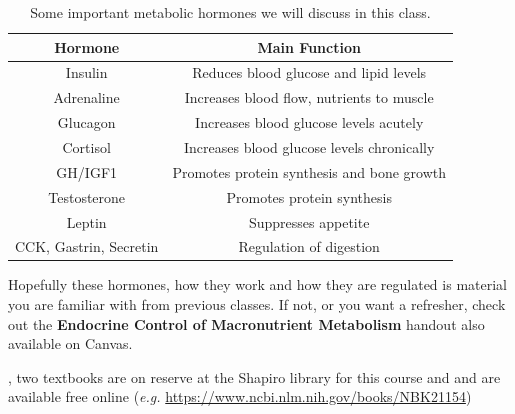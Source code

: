\documentclass{tufte-handout}
\begin{document}
\begin{table}[h]
\centering
\caption{Some important metabolic hormones we will discuss in this class.}
\label{tab:hormones}
\begin{tabular}{cc}
\hline
\textbf{Hormone}       & \textbf{Main Function}                     \\
\hline
Insulin                & Reduces blood glucose and lipid levels     \\
Adrenaline			   & Increases blood flow, nutrients to muscle \\
Glucagon               & Increases blood glucose levels acutely     \\
Cortisol               & Increases blood glucose levels chronically \\
GH/IGF1                & Promotes protein synthesis and bone growth \\
Testosterone           & Promotes protein synthesis                 \\
Leptin                 & Suppresses appetite                        \\
CCK, Gastrin, Secretin & Regulation of digestion                   \\
\hline
\end{tabular}
\end{table}


Hopefully these hormones, how they work and how they are regulated is material you are familiar with from previous classes.  If not, or you want a refresher, check out the \textbf{Endocrine Control of Macronutrient Metabolism} handout also available on Canvas.  

, two textbooks are on reserve at the Shapiro library for this course \cite{Berg2013} and \cite{Ferrier2017} and are available free online (\textit{e.g.} \url{https://www.ncbi.nlm.nih.gov/books/NBK21154})



\end{document}
